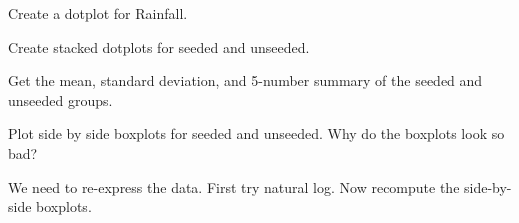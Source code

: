 \documentclass[12pt,letterpaper]{hmcpset}
\begin{document}

\begin{problem}[a]

    Create a dotplot for Rainfall.

\end{problem}

\begin{solution}

\end{solution}
\newpage

\begin{problem}[b]

    Create stacked dotplots for seeded and unseeded.

\end{problem}

\begin{solution}

\end{solution}
\newpage

\begin{problem}[c]

    Get the mean, standard deviation, and 5-number summary of the seeded and unseeded groups.

\end{problem}

\begin{solution}

\end{solution}
\newpage

\begin{problem}[d]

    Plot side by side boxplots for seeded and unseeded. Why do the boxplots look so bad?

\end{problem}

\begin{solution}

\end{solution}
\newpage

\begin{problem}[e]

    We need to re-express the data. First try natural log. Now recompute the side-by-side boxplots.

\end{problem}

\begin{solution}

\end{solution}
\newpage
\end{document}
